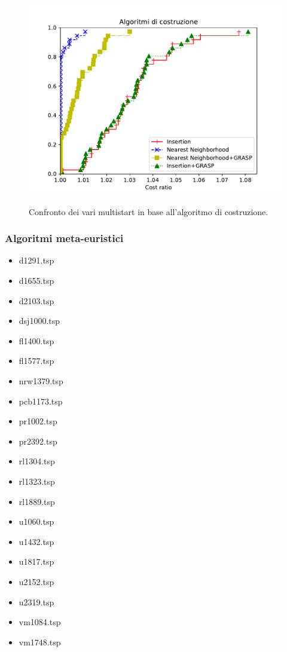 \begin{figure}[h] 
\begin{center} 
  \includegraphics[scale=0.8]{Images/pp_construction}\\ 
  \caption{\footnotesize{Confronto dei vari multistart in base all'algoritmo di costruzione.}}
  \label{perf_profile} 
\end{center} 
\end{figure}

\subsubsection{Algoritmi meta-euristici}
\begin{center}
\begin{multicols}{3}
\begin{itemize}
\item{d1291.tsp}
\item{d1655.tsp} 
\item{d2103.tsp} 
\item{dsj1000.tsp}
\item{fl1400.tsp} 
\item{fl1577.tsp} 
\item{nrw1379.tsp} 
\item{pcb1173.tsp} 
\item{pr1002.tsp}
\item{pr2392.tsp}
\item{rl1304.tsp}
\item{rl1323.tsp}
\item{rl1889.tsp}
\item{u1060.tsp} 
\item{u1432.tsp}
\item{u1817.tsp}
\item{u2152.tsp}
\item{u2319.tsp}
\item{vm1084.tsp}
\item{vm1748.tsp}
\end{itemize}
\end{multicols}
\end{center}

